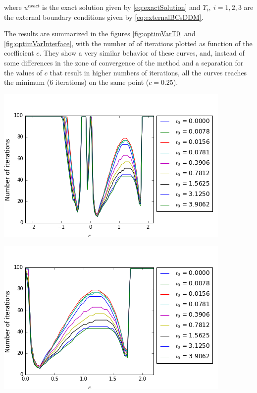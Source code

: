 \noindent where $u^{exact}$ is the exact solution given by \eqref{eq:exactSolution} and $\Upsilon_i , \ i =1,2,3$ are the external boundary conditions given by \eqref{eq:externalBCsDDM}.

\indent The results are summarized in the figures \ref{fig:optimVarT0} and \ref{fig:optimVarInterface}, with the number of of iterations plotted as function of the coefficient $c$. They show a very similar behavior of these curves, and, instead of some differences in the zone of convergence of the method and a separation for the values of $c$ that result in higher numbers of iterations, all the curves reaches the minimum (6 iterations) on the same point ($c = 0.25$).

\begingroup
\begin{minipage}{.5\linewidth}
\begin{center}
	\includegraphics[scale=.4]{figures/NiterxCoefVarT0NegativeCoefCorrectN.png}
\end{center}
\end{minipage}
\begin{minipage}{.5\linewidth}
\begin{center}
	\includegraphics[scale=.4]{figures/NiterxCoefVarT0CorrectN.png}
\end{center}
\end{minipage}
\endgroup

